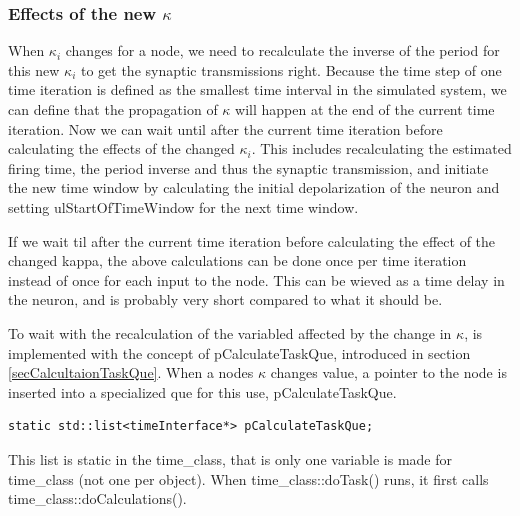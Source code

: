 			\subsubsection{Effects of the new $\kappa$}
			When $\kappa_i$ changes for a node, we need to recalculate the inverse of the period for this new $\kappa_i$ to get the synaptic transmissions right.
			Because the time step of one time iteration is defined as the smallest time interval in the simulated system, we can define that the propagation of $\kappa$ will happen at the end of the current time iteration. %
			Now %
			 we can wait until after the current time iteration before calculating the effects of the changed $\kappa_i$.
			This includes recalculating the estimated firing time, the period inverse and thus the synaptic transmission, and initiate the new time window by calculating the initial depolarization of the neuron and setting 
				ulStartOfTimeWindow for the next time window.

			If we wait til after the current time iteration before calculating the effect of the changed kappa, the above calculations can be done once per time iteration instead of once for each input to the node.
			This can be wieved as a time delay in the neuron, and is probably  very short compared to what it should be. %


			To wait with the recalculation of the variabled affected by the change in $\kappa$, is implemented with the concept of pCalculateTaskQue, introduced in section \ref{secCalcultaionTaskQue}.
			When a nodes $\kappa$ changes value, a pointer to the node is inserted into a specialized que for this use, pCalculateTaskQue.
\begin{lstlisting}
static std::list<timeInterface*> pCalculateTaskQue;
\end{lstlisting}
			This list is static in the time\_class, that is only one variable is made for time\_class (not one per object).
			When time\_class::doTask() runs, it first calls time\_class::doCalculations().

